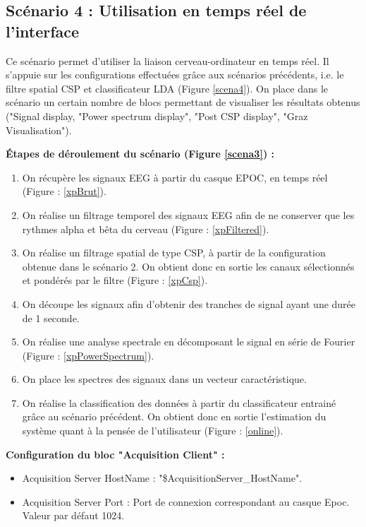\subsection{Scénario 4 : Utilisation en temps réel de l'interface}
\label{Subsection : 6.Scénario 4}
Ce scénario permet d'utiliser la liaison cerveau-ordinateur en temps réel. Il s'appuie sur les configurations effectuées grâce aux scénarios précédents, i.e. le filtre spatial CSP et classificateur LDA (Figure \ref{scena4}). On place dans le scénario un certain nombre de blocs permettant de visualiser les résultats obtenus ("Signal display, "Power spectrum display", "Post CSP display", "Graz Visualisation").

\textbf{Étapes de déroulement du scénario (Figure \ref{scena3}) : }
\begin{enumerate}
	\item On récupère les signaux EEG  à partir du casque EPOC, en temps réel (Figure : \ref{xpBrut}).
	\smallbreak 
	\item On réalise un filtrage temporel des signaux EEG afin de ne conserver que les rythmes alpha et bêta du cerveau (Figure : \ref{xpFiltered}).
	\smallbreak
	\item On réalise un filtrage spatial de type CSP, à partir de la configuration obtenue dans le scénario 2. On obtient donc en sortie les canaux sélectionnés et pondérés par le filtre (Figure : 	\ref{xpCsp}).
	\smallbreak
	\item On découpe les signaux afin d'obtenir des tranches de signal ayant une durée de 1 seconde.
	\smallbreak
	\item On réalise une analyse spectrale en décomposant le signal en série de Fourier (Figure : \ref{xpPowerSpectrum}).
	\smallbreak
	\item On place les spectres des signaux dans un vecteur caractéristique.
	\smallbreak
	\item On réalise la classification des données à partir du classificateur entrainé grâce au scénario précédent. On obtient donc en sortie l'estimation du système quant à la pensée de l'utilisateur (Figure : \ref{online}).
\end{enumerate}

\smallbreak
\textbf{Configuration du bloc "Acquisition Client" : }
\smallbreak
\begin{itemize}
	\item Acquisition Server HostName : "\${AcquisitionServer\_HostName}".
	\smallbreak
	\item Acquisition Server Port : Port de connexion correspondant au casque Epoc. Valeur par défaut 1024.
\end{itemize}

